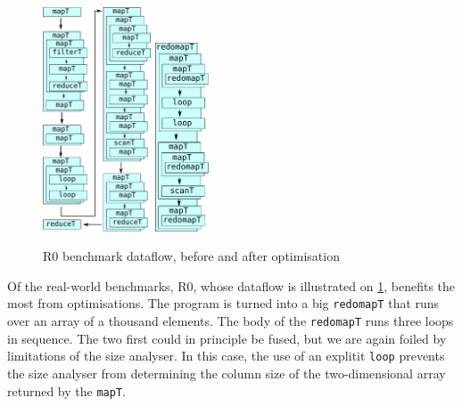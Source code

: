 \begin{figure}
\begin{center}
\includegraphics[width=3.2cm]{img/PricingLexiFi-unfused.pdf}
\hspace{1cm}
\includegraphics[width=1.6cm]{img/PricingLexiFi-fused.pdf}
\end{center}
\caption{R0 benchmark dataflow, before and after optimisation}
\label{fig:r0-dataflow}
\end{figure}

Of the real-world benchmarks, R0, whose dataflow is illustrated on
\cref{fig:r0-dataflow}, benefits the most from optimisations.  The
program is turned into a big \texttt{redomapT} that runs over an array
of a thousand elements.  The body of the \texttt{redomapT} runs three
loops in sequence.  The two first could in principle be fused, but we
are again foiled by limitations of the size analyser.  In this case,
the use of an explitit \texttt{loop} prevents the size analyser from
determining the column size of the two-dimensional array returned by
the \texttt{mapT}.

